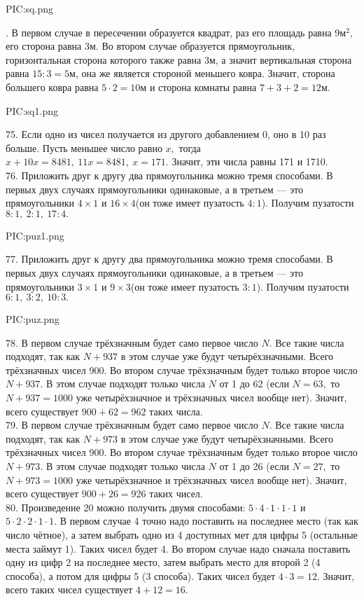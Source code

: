 \begin{center}
{{PIC:sq.png}}
\end{center}
\newpage
{}. В первом случае в пересечении образуется квадрат, раз его площадь равна $9\text{м}^2,$ его сторона равна 3м. Во втором случае образуется прямоугольник, горизонтальная сторона которого также равна 3м, а значит вертикальная сторона равна $15:3=5$м, она же является стороной меньшего ковра. Значит, сторона большего ковра равна $5\cdot2=10$м и сторона комнаты равна $7+3+2=12$м.
\begin{center}
{{PIC:sq1.png}}
\end{center}
75. Если одно из чисел получается из другого добавлением 0, оно в 10 раз больше. Пусть меньшее число равно $x,$ тогда $x+10x=8481,\ 11x=8481,\ x=171.$ Значит, эти числа равны 171 и 1710.\\
76. Приложить друг к другу два прямоугольника можно тремя способами. В первых двух случаях прямоугольники одинаковые, а в третьем --- это прямоугольники $4\times1$ и $16\times4$(он тоже имеет пузатость $4:1$). Получим пузатости $8:1,\ 2:1,\ 17:4.$
\begin{center}
{{PIC:puz1.png}}
\end{center}
77. Приложить друг к другу два прямоугольника можно тремя способами. В первых двух случаях прямоугольники одинаковые, а в третьем --- это прямоугольники $3\times1$ и $9\times3$(он тоже имеет пузатость $3:1$). Получим пузатости $6:1,\ 3:2,\ 10:3.$
\begin{center}
{{PIC:puz.png}}
\end{center}
78. В первом случае трёхзначным будет само первое число $N.$ Все такие числа подходят, так как $N+937$ в этом случае уже будут четырёхзначными. Всего трёхзначных чисел 900. Во втором случае трёхзначным будет только второе число $N+937.$ В этом случае подходят только числа $N$ от 1 до 62 (если $N=63,$ то $N+937=1000$ уже четырёхзначное и трёхзначных чисел вообще нет). Значит, всего существует $900+62=962$ таких числа.\\
79. В первом случае трёхзначным будет само первое число $N.$ Все такие числа подходят, так как $N+973$ в этом случае уже будут четырёхзначными. Всего трёхзначных чисел 900. Во втором случае трёхзначным будет только второе число $N+973.$ В этом случае подходят только числа $N$ от 1 до 26 (если $N=27,$ то $N+973=1000$ уже четырёхзначное и трёхзначных чисел вообще нет). Значит, всего существует $900+26=926$ таких чисел.\\
80. Произведение 20 можно получить двумя способами: $5\cdot4\cdot1\cdot1\cdot1$ и $5\cdot2\cdot2\cdot1\cdot1.$ В первом случае 4 точно надо поставить на последнее место (так как число чётное), а затем выбрать одно из 4 доступных мет для цифры 5 (остальные места займут 1). Таких чисел будет 4. Во втором случае надо сначала поставить одну из цифр 2 на последнее место, затем выбрать место для второй 2 (4 способа), а потом для цифры 5 (3 способа). Таких чисел будет $4\cdot3=12.$ Значит, всего таких чисел существует $4+12=16.$\\
